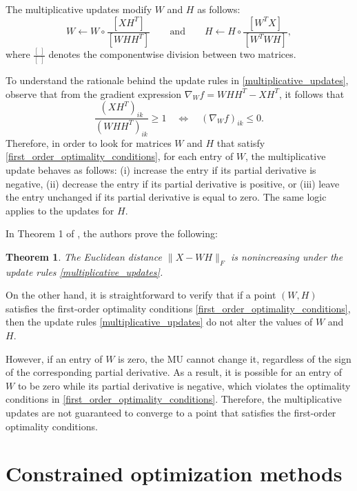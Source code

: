 \documentclass{amsart}
\newtheorem{theo}{Theorem}
\begin{document}
The multiplicative updates modify $W$ and $H$ as follows:
\begin{equation}
    \label{multiplicative_updates}
    W \leftarrow W\circ \frac{\left[XH^T\right]}{\left[WHH^T\right]} \qquad \text{and}\qquad H \leftarrow H\circ \frac{\left[W^TX\right]}{\left[W^TWH\right]},
\end{equation}
where $\frac{[\ ]}{[\ ]}$ denotes the componentwise division between two matrices.

\bigskip

To understand the rationale behind the update rules in \eqref{multiplicative_updates}, observe that from the gradient expression $\nabla_W f= WHH^T-XH^T$, it follows that
\[
    \frac{(XH^T)_{ik}}{(WHH^T)_{ik}}\geq 1 \quad \Leftrightarrow \quad (\nabla_W f)_{ik}\leq 0.
\]
Therefore, in order to look for matrices $W$ and $H$ that satisfy \eqref{first_order_optimality_conditions}, for each entry of $W$, the multiplicative update behaves as follows:
(i) increase the entry if its partial derivative is negative,
(ii) decrease the entry if its partial derivative is positive, or
(iii) leave the entry unchanged if its partial derivative is equal to zero. The same logic applies to the updates for $H$.

In Theorem 1 of \cite{LS}, the authors prove the following:

\begin{theo}
    The Euclidean distance $\|X-WH\|_F$ is nonincreasing under the update rules \eqref{multiplicative_updates}.
\end{theo}

On the other hand, it is straightforward to verify that if a point $(W,H)$ satisfies the first-order optimality conditions \eqref{first_order_optimality_conditions}, then the update rules \eqref{multiplicative_updates} do not alter the values of $W$ and $H$. 

However, if an entry of $W$ is zero, the MU cannot change it, regardless of the sign of the corresponding partial derivative. As a result, it is possible for an entry of $W$ to be zero while its partial derivative is negative, which violates the optimality conditions in \eqref{first_order_optimality_conditions}. Therefore, the multiplicative updates are not guaranteed to converge to a point that satisfies the first-order optimality conditions.




\appendix

\section{Constrained optimization methods}\label{constrained_optimization_methods}
\end{document}
